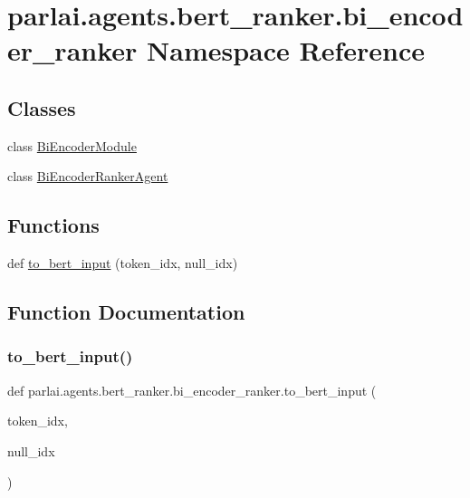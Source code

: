 \hypertarget{namespaceparlai_1_1agents_1_1bert__ranker_1_1bi__encoder__ranker}{}\section{parlai.\+agents.\+bert\+\_\+ranker.\+bi\+\_\+encoder\+\_\+ranker Namespace Reference}
\label{namespaceparlai_1_1agents_1_1bert__ranker_1_1bi__encoder__ranker}
\subsection*{Classes}
\begin{DoxyCompactItemize}
\item 
class \hyperlink{classparlai_1_1agents_1_1bert__ranker_1_1bi__encoder__ranker_1_1BiEncoderModule}{Bi\+Encoder\+Module}
\item 
class \hyperlink{classparlai_1_1agents_1_1bert__ranker_1_1bi__encoder__ranker_1_1BiEncoderRankerAgent}{Bi\+Encoder\+Ranker\+Agent}
\end{DoxyCompactItemize}
\subsection*{Functions}
\begin{DoxyCompactItemize}
\item 
def \hyperlink{namespaceparlai_1_1agents_1_1bert__ranker_1_1bi__encoder__ranker_afd88e1e1699d975ab19ea38e8ae77e20}{to\+\_\+bert\+\_\+input} (token\+\_\+idx, null\+\_\+idx)
\end{DoxyCompactItemize}


\subsection{Function Documentation}
\mbox{\label{namespaceparlai_1_1agents_1_1bert__ranker_1_1bi__encoder__ranker_afd88e1e1699d975ab19ea38e8ae77e20}} 
\subsubsection{\texorpdfstring{to\+\_\+bert\+\_\+input()}{to\_bert\_input()}}
{\footnotesize\ttfamily def parlai.\+agents.\+bert\+\_\+ranker.\+bi\+\_\+encoder\+\_\+ranker.\+to\+\_\+bert\+\_\+input (\begin{DoxyParamCaption}\item[{}]{token\+\_\+idx,  }\item[{}]{null\+\_\+idx }\end{DoxyParamCaption})}


